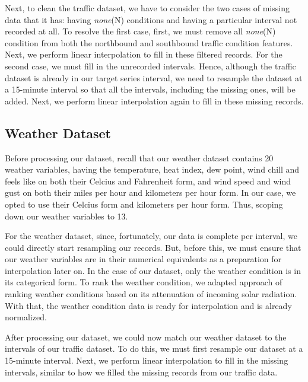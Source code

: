 Next, to clean the traffic dataset, we have to consider the two cases of missing data that it has: having \textit{none}(N) conditions and having a particular interval not recorded at all. To resolve the first case, first, we must remove all \textit{none}(N) condition from both the northbound and southbound traffic condition features. Next, we perform linear interpolation to fill in these filtered records. For the second case, we must fill in the unrecorded intervals. Hence, although the traffic dataset is already in our target series interval, we need to resample the dataset at a 15-minute interval so that all the intervals, including the missing ones, will be added. Next, we perform linear interpolation again to fill in these missing records.



\subsection{Weather Dataset}
Before processing our dataset, recall that our weather dataset contains 20 weather variables, having the temperature, heat index, dew point, wind chill and feels like on both their Celcius and Fahrenheit form, and wind speed and wind gust on both their miles per hour and kilometers per hour form. In our case, we opted to use their Celcius form and kilometers per hour form. Thus, scoping down our weather variables to 13.

For the weather dataset, since, fortunately, our data is complete per interval, we could directly start resampling our records. But, before this, we must ensure that our weather variables are in their numerical equivalents as a preparation for interpolation later on. In the case of our dataset, only the weather condition is in its categorical form. To rank the weather condition, we adapted  approach of ranking weather conditions based on its attenuation of incoming solar radiation. With that, the weather condition data is ready for interpolation and is already normalized.

After processing our dataset, we could now match our weather dataset to the intervals of our traffic dataset. To do this, we must first resample our dataset at a 15-minute interval. Next, we perform linear interpolation to fill in the missing intervals, similar to how we filled the missing records from our traffic data.

